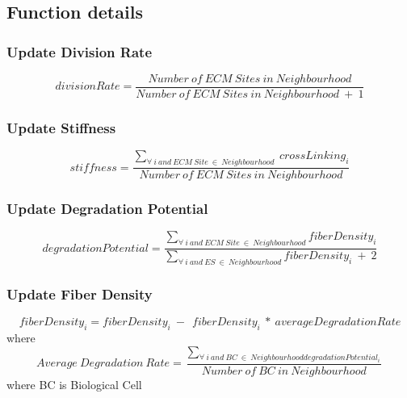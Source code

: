 \documentclass[a4paper,10pt]{article}
\begin{document}
\subsection{Function details}

\subsubsection{Update Division Rate}
\begin{equation}
 divisionRate = \frac{Number\ of\ ECM\ Sites\ in\ Neighbourhood}{ Number\ of\ ECM\ Sites\ in\ Neighbourhood\ +\ 1 }
\end{equation}

\subsubsection{Update Stiffness}
\begin{equation}
 stiffness = \frac{ \sum_{ \forall\ i\ and\ ECM\ Site\ \in\ Neighbourhood }\ crossLinking_i }{ Number\ of\ ECM\ Sites\ in\ Neighbourhood }
\end{equation}

\subsubsection{Update Degradation Potential}
\begin{equation}
 degradationPotential = \frac{\sum_{\forall\ i\ and\ ECM\ Site\  \in\ Neighbourhood} fiberDensity_i}
 {{\sum_{\forall\ i\ and\ ES\  \in\ Neighbourhood} fiberDensity_i\ +\ 2}}
\end{equation}

\subsubsection{Update Fiber Density}
\begin{equation}
 fiberDensity_i = fiberDensity_i\ -\ 
 \ fiberDensity_i\ *\ averageDegradationRate
\end{equation} 
where 
\begin{equation}
 Average\ Degradation\ Rate = \frac{\sum_{\forall\ i\ and\ BC\ \in\ Neighbourhood degradationPotential_i } }
 { Number\ of\ BC\ in\ Neighbourhood }
\end{equation}
where BC is Biological Cell
\end{document}
